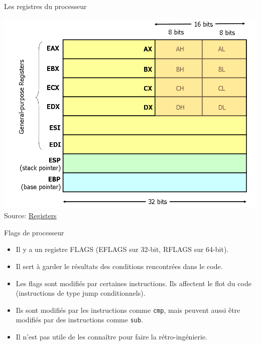 \documentclass[10pt,xcolor={table,dvipsnames},t]{beamer}
\begin{document}
\begin{frame}{Les registres du processeur}

    \begin{center}
    \includegraphics[width=.60\textwidth,height=.60\textheight]{x86-registers}\newline{}
    Source: \href{http://blog.jpauli.tech/2016-11-30-on-c-performances-html/}{Registers}
    \end{center}
\end{frame}

\begin{frame}{Flags de processeur}
    \begin{itemize}
        \item Il y a un registre FLAGS (EFLAGS sur 32-bit, RFLAGS sur 64-bit). 
        \item Il sert à garder le résultats des conditions rencontrées dans le code.
        \item Les flags sont modifiés par certaines instructions. Ils affectent le flot du code (instructions de type jump conditionnels).
        \item Ils sont modifiés par les instructions comme \texttt{cmp}, mais peuvent aussi être modifiés par des instructions comme \texttt{sub}. 
        \item Il n'est pas utile de les connaître pour faire la rétro-ingénierie.
    \end{itemize}
\end{frame}
\end{document}
